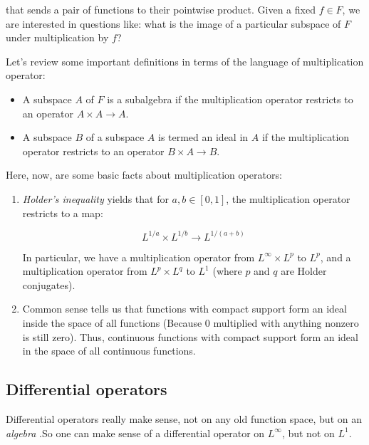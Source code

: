 \documentclass[a4paper]{amsart}
\begin{document}
that sends a pair of functions to their pointwise product. Given a
fixed $f \in F$, we are interested in questions like: what is the
image of a particular subspace of $F$ under multiplication by $f$?

Let's review some important definitions in terms of the language of
multiplication operator:

\begin{itemize}

\item A subspace $A$ of $F$ is a subalgebra if the multiplication
  operator restricts to an operator $A \times A \to A$.

\item A subspace $B$ of a subspace $A$ is termed an ideal in $A$ if
  the multiplication operator restricts to an operator $B \times A \to
  B$.

\end{itemize}

Here, now, are some basic facts about multiplication operators:

\begin{enumerate}

\item {\em Holder's inequality} yields that for $a,b \in [0,1]$, the
  multiplication operator restricts to a map:

  $$L^{1/a} \times L^{1/b} \to L^{1/(a+b)}$$

  In particular, we have a multiplication operator from $L^\infty
  \times L^p$ to $L^p$, and a multiplication operator from $L^p \times
  L^q$ to $L^1$ (where $p$ and $q$ are Holder conjugates).

\item Common sense tells us that functions with compact support form
  an ideal inside the space of all functions (Because $0$ multiplied
  with anything nonzero is still zero). Thus, continuous functions
  with compact support form an ideal in the space of all continuous
  functions.

\end{enumerate}

\subsection{Differential operators}\label{diffopsintro}

Differential operators really make sense, not on any old function
space, but on an {\em algebra} .So one can make sense of a
differential operator on $L^\infty$, but not on $L^1$.
\end{document}
